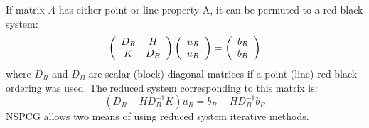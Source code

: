      If matrix $A$ has either point or line property A, it can be
permuted to a red-black system:
\[
   \left( \begin{array}{cc}
              D_R & H \\
              K   & D_B \end{array} \right)
   \left( \begin{array}{c}
              u_R \\
              u_B       \end{array} \right) =
   \left( \begin{array}{c}
              b_R \\
              b_B       \end{array} \right)
\]
where $D_R$ and $D_B$ are scalar (block) diagonal matrices if a
point (line) red-black ordering was used.  The reduced system
corresponding to this matrix is:
\[
   (D_R - H D_B^{-1} K) u_R =  b_R - H D_B^{-1} b_B
\]
NSPCG allows two means of using reduced system iterative methods.
